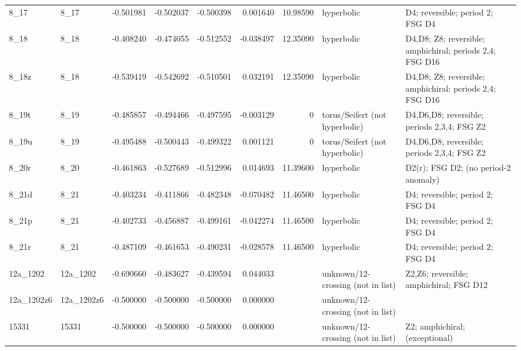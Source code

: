 \begin{table}[h!]
\begin{tabular}{llrrrrrll}
8\_17 & 8\_17 & -0.501981 & -0.502037 & -0.500398 & 0.001640 & 10.98590 & hyperbolic & D4; reversible; period 2; FSG D4 \\
8\_18 & 8\_18 & -0.408240 & -0.474055 & -0.512552 & -0.038497 & 12.35090 & hyperbolic & D4,D8; Z8; reversible; amphichiral; periods 2,4; FSG D16 \\
8\_18z & 8\_18 & -0.539419 & -0.542692 & -0.510501 & 0.032191 & 12.35090 & hyperbolic & D4,D8; Z8; reversible; amphichiral; periods 2,4; FSG D16 \\
8\_19t & 8\_19 & -0.485857 & -0.494466 & -0.497595 & -0.003129 & 0 & torus/Seifert (not hyperbolic) & D4,D6,D8; reversible; periods 2,3,4; FSG Z2 \\
8\_19u & 8\_19 & -0.495488 & -0.500443 & -0.499322 & 0.001121 & 0 & torus/Seifert (not hyperbolic) & D4,D6,D8; reversible; periods 2,3,4; FSG Z2 \\
8\_20r & 8\_20 & -0.461863 & -0.527689 & -0.512996 & 0.014693 & 11.39600 & hyperbolic & D2(r); FSG D2; (no period-2 anomaly) \\
8\_21d & 8\_21 & -0.403234 & -0.411866 & -0.482348 & -0.070482 & 11.46500 & hyperbolic & D4; reversible; period 2; FSG D4 \\
8\_21p & 8\_21 & -0.402733 & -0.456887 & -0.499161 & -0.042274 & 11.46500 & hyperbolic & D4; reversible; period 2; FSG D4 \\
8\_21r & 8\_21 & -0.487109 & -0.461653 & -0.490231 & -0.028578 & 11.46500 & hyperbolic & D4; reversible; period 2; FSG D4 \\
12a\_1202 & 12a\_1202 & -0.690660 & -0.483627 & -0.439594 & 0.044033 &  & unknown/12-crossing (not in list) & Z2,Z6; reversible; amphichiral; FSG D12 \\
12a\_1202z6 & 12a\_1202z6 & -0.500000 & -0.500000 & -0.500000 & 0.000000 &  & unknown/12-crossing (not in list) &  \\
15331 & 15331 & -0.500000 & -0.500000 & -0.500000 & 0.000000 &  & unknown/12-crossing (not in list) & Z2; amphichiral; (exceptional) \\
\bottomrule
\end{tabular}
\end{table}
